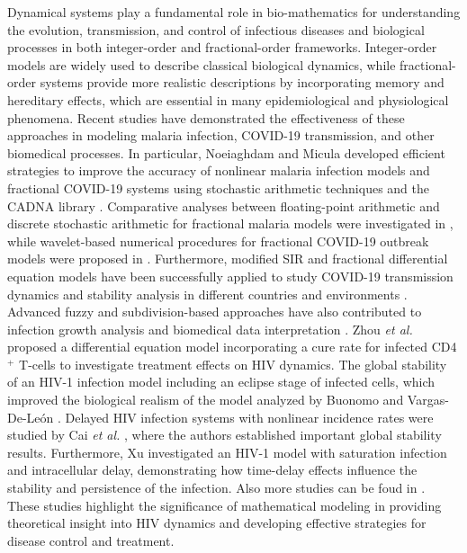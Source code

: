 \documentclass{article}
\theoremstyle{plain}
\theoremstyle{definition}
\numberwithin{equation}{section}
\begin{document}






Dynamical systems play a fundamental role in bio-mathematics for understanding the evolution, transmission, and control of infectious diseases and biological processes in both integer-order and fractional-order frameworks. Integer-order models are widely used to describe classical biological dynamics, while fractional-order systems provide more realistic descriptions by incorporating memory and hereditary effects, which are essential in many epidemiological and physiological phenomena. Recent studies have demonstrated the effectiveness of these approaches in modeling malaria infection, COVID-19 transmission, and other biomedical processes. In particular, Noeiaghdam and Micula developed efficient strategies to improve the accuracy of nonlinear malaria infection models and fractional COVID-19 systems using stochastic arithmetic techniques and the CADNA library \cite{s4,s6}. Comparative analyses between floating-point arithmetic and discrete stochastic arithmetic for fractional malaria models were investigated in \cite{s5}, while wavelet-based numerical procedures for fractional COVID-19 outbreak models were proposed in \cite{s7}. Furthermore, modified SIR and fractional differential equation models have been successfully applied to study COVID-19 transmission dynamics and stability analysis in different countries and environments \cite{s8,s9,s10}. Advanced fuzzy and subdivision-based approaches have also contributed to infection growth analysis and biomedical data interpretation \cite{s11}.  Zhou \textit{et al.} \cite{s20} proposed a differential equation model incorporating a cure rate for infected CD4$^{+}$ T-cells to investigate treatment effects on HIV dynamics. The global stability of an HIV-1 infection model including an eclipse stage of infected cells, which improved the biological realism of the model  analyzed by Buonomo and Vargas-De-León \cite{s21}. Delayed HIV infection systems with nonlinear incidence rates were studied by Cai \textit{et al.} \cite{s22}, where the authors established important global stability results. Furthermore, Xu \cite{s23} investigated an HIV-1 model with saturation infection and intracellular delay, demonstrating how time-delay effects influence the stability and persistence of the infection. Also more studies can be foud in \cite{s24}. These studies highlight the significance of mathematical modeling in providing theoretical insight into HIV dynamics and developing effective strategies for disease control and treatment.
\end{document}
